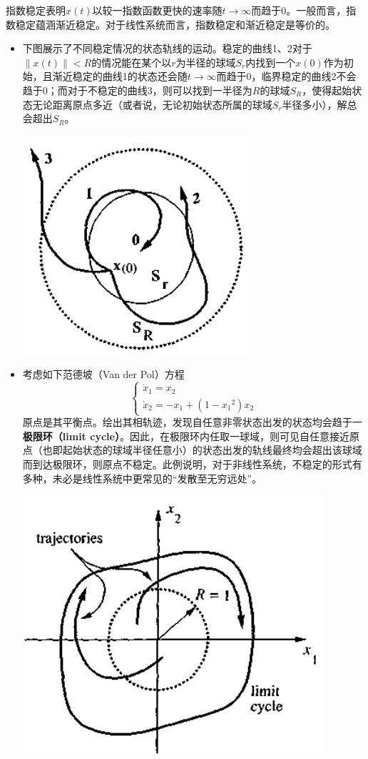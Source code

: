 \begin{note}
  指数稳定表明$x(t)$以较一指数函数更快的速率随$t\to\infty$而趋于$0$。一般而言，指数稳定蕴涵渐近稳定。对于线性系统而言，指数稳定和渐近稳定是等价的。
\end{note}
\newpage
\begin{example}[稳定与不稳定的图示]\label{stable_unstable}
  \begin{itemize}[leftmargin=1em]
    \item 下图展示了不同稳定情况的状态轨线的运动。稳定的曲线1、2对于$\|x(t)\|<R$的情况能在某个以$r$为半径的球域$S_r$内找到一个$x(0)$作为初始，且渐近稳定的曲线1的状态还会随$t\to\infty$而趋于$0$，临界稳定的曲线2不会趋于$0$；而对于不稳定的曲线3，则可以找到一半径为$R$的球域$S_R$，使得起始状态无论距离原点多近（或者说，无论初始状态所属的球域$S_r$半径多小），解总会超出$S_R$。
    \begin{center}
      \includegraphics[width=0.3\linewidth]{figure/nonlinear/stable.png}
    \end{center}
    \item 考虑如下范德坡（Van der Pol）方程\[\begin{cases}
      \dot{x}_{1}=x_{2}\\\dot{x}_{2}=- x_{1}+(1-{x_{1}}^{2})x_{2}
    \end{cases}\]
    原点是其平衡点。绘出其相轨迹，发现自任意非零状态出发的状态均会趋于一{\bf 极限环（limit cycle）}。因此，在极限环内任取一球域，则可见自任意接近原点（也即起始状态的球域半径任意小）的状态出发的轨线最终均会超出该球域而到达极限环，则原点不稳定。此例说明，对于非线性系统，不稳定的形式有多种，未必是线性系统中更常见的“发散至无穷远处”。
    \begin{center}
      \includegraphics[width=0.34\linewidth]{figure/nonlinear/vanderpol.png}

\end{center}
\end{itemize}
\end{example}
